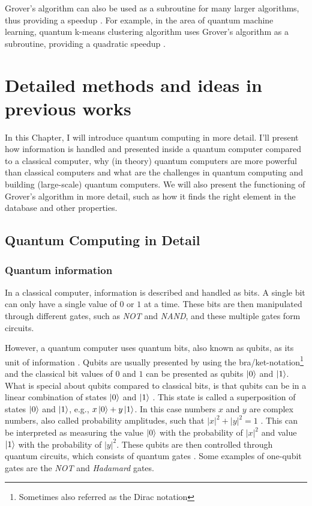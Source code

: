 \documentclass[english,oneside,openright]{UH_DS_report}
\begin{document}
Grover's algorithm can also be used as a subroutine for many larger algorithms, thus providing a speedup \cite{giri2017review}. For example, in the area of quantum machine learning, quantum k-means clustering algorithm uses Grover's algorithm as a subroutine, providing a quadratic speedup \cite{zhang2020recent}.

\chapter{Detailed methods and ideas in previous works}
\label{chapter:previouswork}

In this Chapter, I will introduce quantum computing in more detail. I'll present how information is handled and presented inside a quantum computer compared to a classical computer, why (in theory) quantum computers are more powerful than classical computers and what are the challenges in quantum computing and building (large-scale) quantum computers. We will also present the functioning of Grover's algorithm in more detail, such as how it finds the right element in the database and other properties.

\section{Quantum Computing in Detail}

\subsection{Quantum information}
In a classical computer, information is described and handled as bits. A single bit can only have a single value of $0$ or $1$ at a time. These bits are then manipulated through different gates, such as \emph{NOT} and \emph{NAND}, and these multiple gates form circuits.

However, a quantum computer uses quantum bits, also known as qubits, as its unit of information \cite{introtoqc}. Qubits are usually presented by using the bra/ket-notation\footnote{Sometimes also referred as the Dirac notation} and the classical bit values of $0$ and $1$ can be presented as qubits $\ket{0}$ and $\ket{1}$. What is special about qubits compared to classical bits, is that qubits can be in a linear combination of states $\ket{0}$ and $\ket{1}$ \cite{lavor2003grover}. This state is called a superposition of states $\ket{0}$ and $\ket{1}$, e.g., $x \ket{0} + y \ket{1}$. In this case numbers $x$ and $y$ are complex numbers, also called probability amplitudes, such that $|x|^{2} + |y|^{2} = 1$ \cite{qcdb}. This can be interpreted as measuring the value $\ket{0}$ with the probability of $|x|^{2}$ and value $\ket{1}$ with the probability of $|y|^{2}$. These qubits are then controlled through quantum circuits, which consists of quantum gates \cite{lavor2003grover}. Some examples of one-qubit gates are the \emph{NOT} and \emph{Hadamard} gates.
\end{document}
